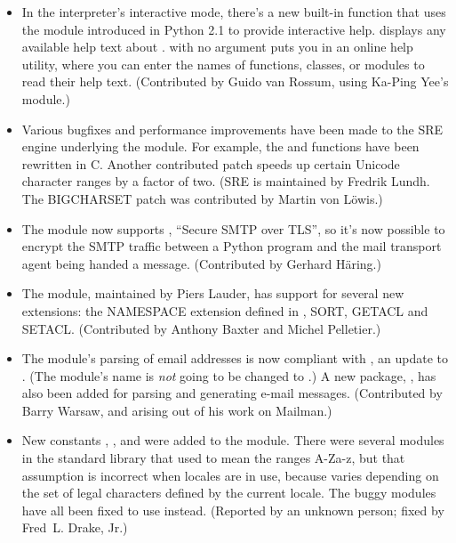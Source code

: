 \documentclass{howto}
\begin{document}
\begin{itemize}
  \item In the interpreter's interactive mode, there's a new built-in
  function  that uses the  module
  introduced in Python 2.1 to provide interactive help.
   displays any available help text about
  .   with no argument puts you in an online
  help utility, where you can enter the names of functions, classes,
  or modules to read their help text.
  (Contributed by Guido van Rossum, using Ka-Ping Yee's  module.)

  \item Various bugfixes and performance improvements have been made
  to the SRE engine underlying the  module.  For example,
  the  and  functions have
  been rewritten in C.  Another contributed patch speeds up certain
  Unicode character ranges by a factor of two. (SRE is maintained by
  Fredrik Lundh.  The BIGCHARSET patch was contributed by Martin von
  L\"owis.)

  \item The  module now supports , ``Secure
  SMTP over TLS'', so it's now possible to encrypt the SMTP traffic
  between a Python program and the mail transport agent being handed a
  message.  (Contributed by Gerhard H\"aring.)

  \item The  module, maintained by Piers Lauder, has
  support for several new extensions: the NAMESPACE extension defined
  in , SORT, GETACL and SETACL.  (Contributed by Anthony
  Baxter and Michel Pelletier.)

  \item The  module's parsing of email addresses is now
  compliant with , an update to .  (The module's
  name is \emph{not} going to be changed to .)  A new
  package, , has also been added for parsing and
  generating e-mail messages.  (Contributed by Barry Warsaw, and
  arising out of his work on Mailman.)

  \item New constants ,
  , and  were
  added to the  module.  There were several modules in
  the standard library that used  to mean the
  ranges A-Za-z, but that assumption is incorrect when locales are in
  use, because  varies depending on the set
  of legal characters defined by the current locale.  The buggy
  modules have all been fixed to use  instead.
  (Reported by an unknown person; fixed by Fred~L. Drake, Jr.)


\end{itemize}
\end{document}
